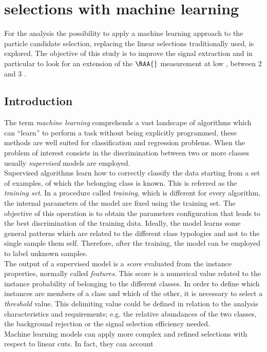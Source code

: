 \section{\Dsubs{} selections with machine learning}
For the \Dsubs{} analysis the possibility to apply a machine learning approach to the particle candidate selection, 
replacing the linear selections traditionally used, is explored. The objective of this study is to improve the \Dsubs{} 
signal extraction and in particular to look for an extension of the \(\RAA{}\) measurement at low \pt{}, between 2 and 3 \GeV{}.

\subsection{Introduction}
The term \textit{machine learning} comprehends a vast landscape of algorithms which can ``learn'' to perform a task without being explicitly programmed,
these methods are well suited for classification and regression problems. When the problem of interest consists in the discrimination between two or more classes 
usually \textit{supervised} models are employed. \\ 
Supervised algorithms learn how to correctly classify the data starting from a set of examples, of which the belonging class is known. This is referred as the \textit{training set}. 
In a procedure called \textit{training}, which is different for every algorithm, the internal parameters of the model are fixed using the training set. 
The objective of this operation is to obtain the parameters configuration that leads to the best discrimination of the training data. 
Ideally, the model learns some general patterns which are related to the different class typologies and not to the single sample them self. 
Therefore, after the training, the model can be employed to label unknown samples. \\
The output of a supervised model is a \textit{score} evaluated from the instance properties, normally called \textit{features}. 
This score is a numerical value related to the instance probability of belonging to the different classes. 
In order to define which instances are members of a class and which of the other, it is necessary to select a \textit{threshold} value. 
This delimiting value could be defined in relation to the analysis characteristics and requirements; e.g. the relative abundances of the two classes, 
the background rejection or the signal selection efficiency needed. \\
Machine learning models can apply more complex and refined selections with respect to linear cuts. In fact, they can account 

